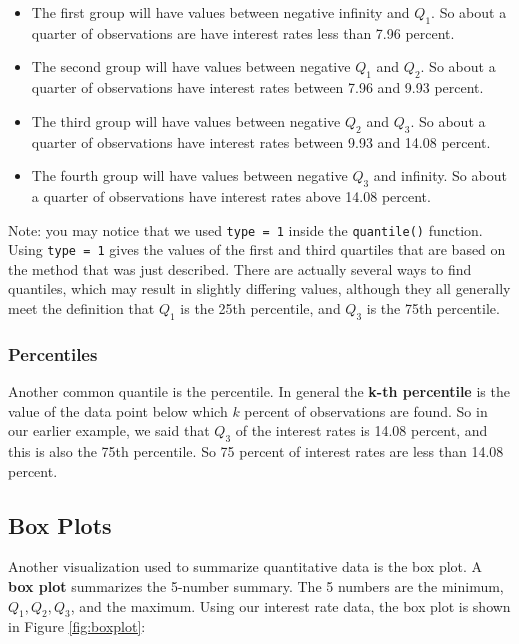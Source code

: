 \documentclass[
]{book}
\providecommand{\tightlist}{%
  \setlength{\itemsep}{0pt}\setlength{\parskip}{0pt}}
\begin{document}
\begin{itemize}
\tightlist
\item
  The first group will have values between negative infinity and \(Q_1\). So about a quarter of observations are have interest rates less than 7.96 percent.
\item
  The second group will have values between negative \(Q_1\) and \(Q_2\). So about a quarter of observations have interest rates between 7.96 and 9.93 percent.
\item
  The third group will have values between negative \(Q_2\) and \(Q_3\). So about a quarter of observations have interest rates between 9.93 and 14.08 percent.
\item
  The fourth group will have values between negative \(Q_3\) and infinity. So about a quarter of observations have interest rates above 14.08 percent.
\end{itemize}

Note: you may notice that we used \texttt{type\ =\ 1} inside the \texttt{quantile()} function. Using \texttt{type\ =\ 1} gives the values of the first and third quartiles that are based on the method that was just described. There are actually several ways to find quantiles, which may result in slightly differing values, although they all generally meet the definition that \(Q_1\) is the 25th percentile, and \(Q_3\) is the 75th percentile.

\subsubsection{Percentiles}\label{percentiles}

Another common quantile is the percentile. In general the \textbf{k-th percentile} is the value of the data point below which \(k\) percent of observations are found. So in our earlier example, we said that \(Q_3\) of the interest rates is 14.08 percent, and this is also the 75th percentile. So 75 percent of interest rates are less than 14.08 percent.

\subsection{Box Plots}\label{box-plots}

Another visualization used to summarize quantitative data is the box plot. A \textbf{box plot} summarizes the 5-number summary. The 5 numbers are the minimum, \(Q_1, Q_2, Q_3\), and the maximum. Using our interest rate data, the box plot is shown in Figure \ref{fig:boxplot}:
\end{document}
